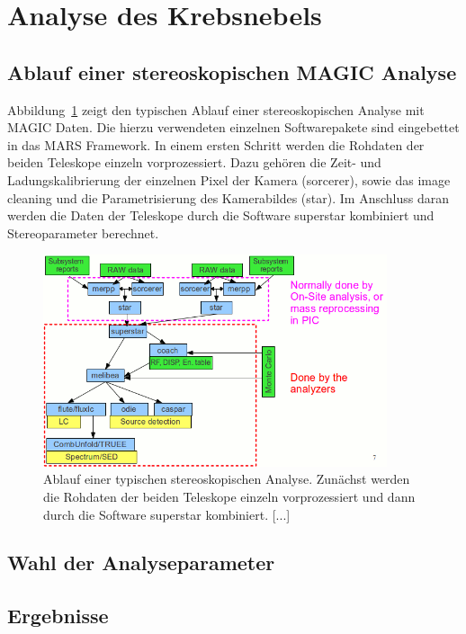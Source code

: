 \section{Analyse des Krebsnebels}
\label{sec:analyse}

\subsection{Ablauf einer stereoskopischen MAGIC Analyse}

Abbildung~\ref{fig:analysischain} zeigt den typischen Ablauf einer
stereoskopischen Analyse mit MAGIC Daten. Die hierzu verwendeten einzelnen
Softwarepakete sind eingebettet in das MARS Framework. In einem ersten Schritt
werden die Rohdaten der beiden Teleskope einzeln vorprozessiert. Dazu gehören
die Zeit- und Ladungskalibrierung der einzelnen Pixel der Kamera (sorcerer),
sowie das image cleaning und die Parametrisierung des Kamerabildes (star).
Im Anschluss daran werden die Daten der Teleskope durch die Software superstar
kombiniert und Stereoparameter berechnet. 

\begin{figure}
  \centering
  \includegraphics[width=0.9\textwidth]{figures/analysischain.png}
  \caption{Ablauf einer typischen stereoskopischen Analyse. Zunächst werden die
  Rohdaten der beiden Teleskope einzeln vorprozessiert und dann durch die
  Software superstar kombiniert. [...]}
  \label{fig:analysischain}
\end{figure}

\subsection{Wahl der Analyseparameter}

\subsection{Ergebnisse}
